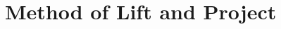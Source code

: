 \documentclass[main]{subfiles}
\begin{document}

\section{Method of Lift and Project}
\end{document}
